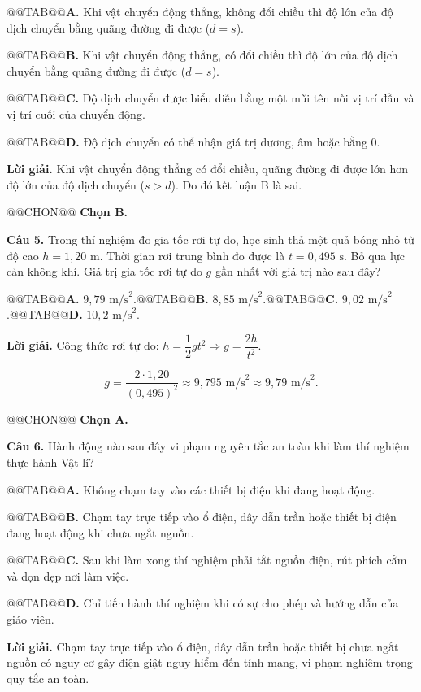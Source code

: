 \documentclass{article}
\begin{document}
@@TAB@@\textbf{A.} Khi vật chuyển động thẳng, không đổi chiều thì độ lớn của độ dịch chuyển bằng quãng đường đi được ($d = s$).

@@TAB@@\textbf{B.} Khi vật chuyển động thẳng, có đổi chiều thì độ lớn của độ dịch chuyển bằng quãng đường đi được ($d = s$).

@@TAB@@\textbf{C.} Độ dịch chuyển được biểu diễn bằng một mũi tên nối vị trí đầu và vị trí cuối của chuyển động.

@@TAB@@\textbf{D.} Độ dịch chuyển có thể nhận giá trị dương, âm hoặc bằng $0$.

\textbf{Lời giải.} Khi vật chuyển động thẳng có đổi chiều, quãng đường đi được lớn hơn độ lớn của độ dịch chuyển ($s > d$). Do đó kết luận B là sai.

@@CHON@@ \textbf{Chọn B.}

\textbf{Câu 5.} Trong thí nghiệm đo gia tốc rơi tự do, học sinh thả một quả bóng nhỏ từ độ cao $h = 1{,}20\text{ m}$. Thời gian rơi trung bình đo được là $t = 0{,}495\text{ s}$. Bỏ qua lực cản không khí. Giá trị gia tốc rơi tự do $g$ gần nhất với giá trị nào sau đây?

@@TAB@@\textbf{A.} $9{,}79\text{ m/s}^2$.@@TAB@@\textbf{B.} $8{,}85\text{ m/s}^2$.@@TAB@@\textbf{C.} $9{,}02\text{ m/s}^2$.@@TAB@@\textbf{D.} $10{,}2\text{ m/s}^2$.

\textbf{Lời giải.} Công thức rơi tự do: $h = \dfrac{1}{2}gt^2 \Rightarrow g = \dfrac{2h}{t^2}$.

\[g = \frac{2 \cdot 1{,}20}{(0{,}495)^2} \approx 9{,}795\text{ m/s}^2 \approx 9{,}79\text{ m/s}^2.\]

@@CHON@@ \textbf{Chọn A.}

\textbf{Câu 6.} Hành động nào sau đây vi phạm nguyên tắc an toàn khi làm thí nghiệm thực hành Vật lí?

@@TAB@@\textbf{A.} Không chạm tay vào các thiết bị điện khi đang hoạt động.

@@TAB@@\textbf{B.} Chạm tay trực tiếp vào ổ điện, dây dẫn trần hoặc thiết bị điện đang hoạt động khi chưa ngắt nguồn.

@@TAB@@\textbf{C.} Sau khi làm xong thí nghiệm phải tắt nguồn điện, rút phích cắm và dọn dẹp nơi làm việc.

@@TAB@@\textbf{D.} Chỉ tiến hành thí nghiệm khi có sự cho phép và hướng dẫn của giáo viên.

\textbf{Lời giải.} Chạm tay trực tiếp vào ổ điện, dây dẫn trần hoặc thiết bị chưa ngắt nguồn có nguy cơ gây điện giật nguy hiểm đến tính mạng, vi phạm nghiêm trọng quy tắc an toàn.
\end{document}
